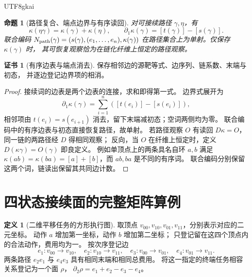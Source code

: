 \documentclass[12pt,a4paper,openany,notitlepage]{report}
\theoremstyle{plain}
\newtheorem{proposition}[theorem]{命题}
\theoremstyle{definition}
\newtheorem{definition}[theorem]{定义}
\newtheorem*{certificate}{证书}
\theoremstyle{remark}
\def\mathcal#1{#1}\def\mathsf#1{#1}\def\mathbb#1{#1}%
\begin{document}
\begin{CJK*}{UTF8}{gkai}
\begin{proposition}[路径复合、端点边界与有序读回]
\label{exp:task:word-chain}
对可接续路径 $\gamma,\eta$，有
\[
 \kappa(\eta\gamma)=\kappa(\gamma)+\kappa(\eta),\qquad
 \partial_1\kappa(\gamma)=[t(\gamma)]-[s(\gamma)].
\]
联合编码
$\mathcal N_{\rm path}(\gamma)=(s(\gamma),(e_1,\ldots,e_n),\kappa(\gamma))$
在路径集合上为单射。仅保存 $\kappa(\gamma)$ 时，
其可恢复观察恰为在链化纤维上恒定的路径观察。
\end{proposition}
\begin{certificate}[有序边表与端点消去]
保存相邻边的源靶等式、边序列、链系数、末端与初态，
并逐边登记边界项的相消。
\end{certificate}
\begin{proof}
接续词的边表是两个边表的连接，求和即得第一式。
边界式展开为
\[
 \partial_1\kappa(\gamma)
 =\sum_{i=1}^{n}([t(e_i)]-[s(e_i)]),
\]
相邻项由 $t(e_i)=s(e_{i+1})$ 消去，留下末端减初态；空词两侧均为零。
联合编码中的有序边表与初态直接恢复路径，故单射。
若路径观察 $O$ 有读回 $D\kappa=O$，同一链的两路径经 $D$ 得相同观察；
反向，当 $O$ 在纤维上恒定时，定义 $D(\kappa\gamma)=O(\gamma)$ 即良定义。
例如单顶点上的两条具名自环 $a,b$ 满足
$\kappa(ab)=\kappa(ba)=[a]+[b]$，而 $ab,ba$ 是不同的有序词。
联合编码分别保留这两个词，链读出保留其共同边计数。
\end{proof}

\section{四状态接续面的完整矩阵算例}

\begin{definition}[二维平移任务的方形执行图]
\label{exp:task:square}
取顶点 $v_{00},v_{10},v_{01},v_{11}$，分别表示对应的二元坐标。
动作 $a$ 增加第一坐标，动作 $b$ 增加第二坐标；
只登记留在这四个顶点内的合法动作，费用均为一。
按次序登记边
\[
 e_1:v_{00}\to v_{10},\quad e_2:v_{10}\to v_{11},\quad
 e_3:v_{00}\to v_{01},\quad e_4:v_{01}\to v_{11}.
\]
两条路径 $e_2e_1$ 与 $e_4e_3$ 具有相同末端和相同总费用。
将这一指定的终端任务相容关系登记为一个面 $\rho$，
$\partial_2\rho=e_1+e_2-e_3-e_4$。
\end{definition}


\end{CJK*}
\end{document}
